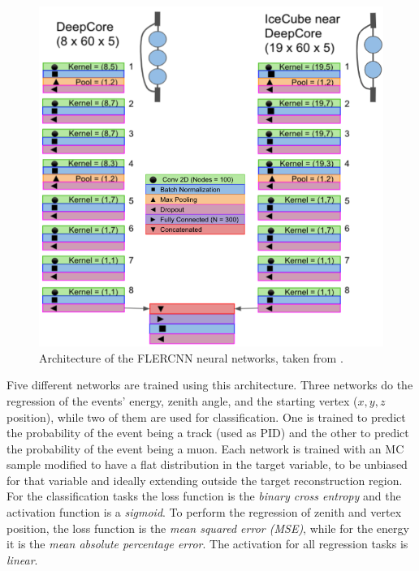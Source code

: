 
\begin{figure}
    \includegraphics{figures/simulation_and_processing/flercnn/Detailed_CNN_Architecture_combined.png}
	\caption[FLERCNN architecture]{Architecture of the FLERCNN neural networks, taken from \cite{flercnn_proceedings}.}
\end{figure}


Five different networks are trained using this architecture. Three networks do the regression of the events' energy, zenith angle, and the starting vertex ($x,y,z$ position), while two of them are used for classification. One is trained to predict the probability of the event being a track (used as PID) and the other to predict the probability of the event being a muon. Each network is trained with an MC sample modified to have a flat distribution in the target variable, to be unbiased for that variable and ideally extending outside the target reconstruction region.
For the classification tasks the loss function is the \textit{binary cross entropy} and the activation function is a \textit{sigmoid}. To perform the regression of zenith and vertex position, the loss function is the \textit{mean squared error (MSE)}, while for the energy it is the \textit{mean absolute percentage error}. The activation for all regression tasks is \textit{linear}.

